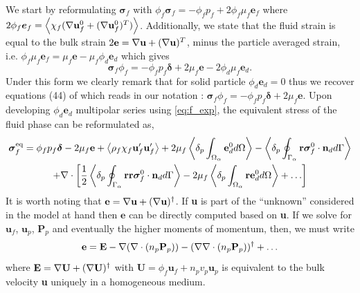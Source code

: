 We start by reformulating $\bm{\sigma}_f$ with $\phi_f \bm{\sigma}_f = - \phi_f p_f + 2 \phi_f \mu_f \textbf{e}_f$ where $2 \phi_f \bm{e}_f = \left<\chi_f  (\mathbf{\nabla} \textbf{u}_f^0 + (\mathbf{\nabla} \textbf{u}_f^0)^T)\right>$. 
Additionally, we state that the fluid strain is equal to the bulk strain $2\textbf{e} = \mathbf{\nabla} \textbf{u}+ (\mathbf{\nabla} \textbf{u})^T$, minus the particle averaged strain, i.e. $\phi_f \mu_f \textbf{e}_f = \mu_f\textbf{e} - \mu_f \phi_d \textbf{e}_d$ which gives
\begin{equation*}
    \bm\sigma_f\phi_f =-\phi_f p_f \bm\delta + 2 \mu_f \textbf{e} -2\phi_d \mu_f \textbf{e}_d.
    \label{eq:def_sigma_f}
\end{equation*}
Under this form we clearly remark that for solid particle $\phi_d \textbf{e}_d = 0$ thus we recover equations (44) of \citet{jackson1997locally} which reads in our notation : $\bm\sigma_f\phi_f =-\phi_f p_f \bm\delta + 2 \mu_f \textbf{e}$. 
Upon developing $\phi_d \textbf{e}_d$ multipolar series using \ref{eq:f_exp}, the equivalent stress of the fluid phase can be reformulated as, 
\begin{multline}
    \bm{\sigma}^\text{eq}_f = 
    \phi_f p_f \bm\delta 
    - 2\mu_f \textbf{e} 
    +\avg{\rho_f\chi_f\textbf{u}_f'\textbf{u}_f'} 
    + 2 \mu_f \pOavg{\textbf{e}_d^0}
    - \pSavg{\textbf{r}\bm{\sigma}_f^0\cdot \textbf{n}_d}
    \\
    + \div \left[
        \frac{1}{2} \pSavg{\textbf{rr}\bm{\sigma}_f^0\cdot \textbf{n}_d}
        - 2 \mu_f\pOavg{ \textbf{re}_d^0 }
        + \ldots
    \right]
    \label{eq:sigma_eq_0}
\end{multline} 
It is worth noting that $\textbf{e} = \mathbf{\nabla} \textbf{u} + (\mathbf{\nabla} \textbf{u})^\dagger$. 
If \textbf{u} is part of the ``unknown'' considered in the model at hand then $\textbf{e}$ can be directly computed based on \textbf{u}. 
If we solve for $\textbf{u}_f$, $\textbf{u}_p$, $\textbf{P}_p$ and eventually the higher moments of momentum, then, we must write 
\begin{equation}
    \textbf{e}
    = 
    \textbf{E}
    - \grad (\div (n_p \textbf{P}_p))
    - (\grad \div (n_p \textbf{P}_p))^\dagger
    + \ldots
    \label{eq:rate_of_strain}
\end{equation}
where $\textbf{E} = \mathbf{\nabla} \textbf{U} + (\mathbf{\nabla} \textbf{U})^\dagger$ with $\textbf{U} = \phi_f \textbf{u}_f + n_p v_p \textbf{u}_p$ is equivalent to the bulk velocity \textbf{u} uniquely in a homogeneous medium. 

